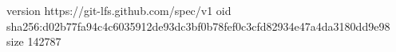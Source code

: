 version https://git-lfs.github.com/spec/v1
oid sha256:d02b77fa94c4c6035912de93dc3bf0b78fef0c3cfd82934e47a4da3180dd9e98
size 142787
